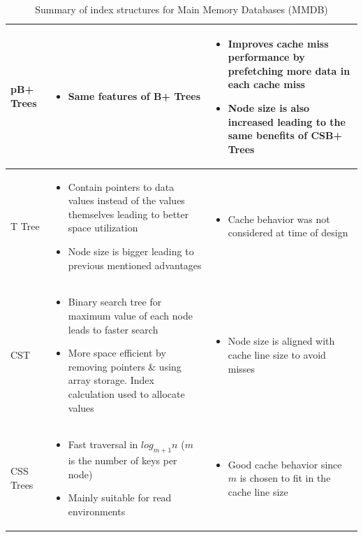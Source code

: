 \documentclass[12pt,a4paper]{article}
\begin{document}
\begin{table}[t!]
{\begin{tabular}{p{2cm}|p{6cm}|p{6cm}}
pB+ Trees & \begin{itemize}
              \item Same features of B+ Trees
             \end{itemize} &
\begin{itemize}
 \item Improves cache miss performance by prefetching more data in each cache miss
\item Node size is also increased leading to the same benefits of CSB+ Trees
\end{itemize}\\
\hline
T Tree &  \begin{itemize}
              \item Contain pointers to data values instead of the values themselves leading to better space utilization
\item Node size is bigger leading to previous mentioned advantages
             \end{itemize} &
\begin{itemize}
 \item Cache behavior was not considered at time of design
\end{itemize}\\
\hline
CST & \begin{itemize}
       \item Binary search tree for maximum value of each node leads to faster search
\item More space efficient by removing pointers \& using array storage. Index calculation used to allocate values
      \end{itemize} &
\begin{itemize}
 \item Node size is aligned with cache line size to avoid misses
\end{itemize}\\
\hline
CSS Trees &  \begin{itemize}
       \item Fast traversal in $log_{m+1}n$ ($m$ is the number of keys per node)
\item Mainly suitable for read environments
      \end{itemize} &
\begin{itemize}
 \item Good cache behavior since $m$ is chosen to fit in the cache line size
\end{itemize}\\

\end{tabular}
}
\caption{Summary of index structures for Main Memory Databases (MMDB)}
\label{tab:mmdbindexsumm}
\end{table}
\end{document}

